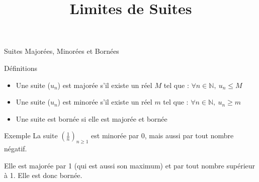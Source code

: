 \documentclass{cours}
\title{Limites de Suites}
\begin{document}

    \begin{Gpartie}{Suites Majorées, Minorées et Bornées} 
        \begin{Spartie}{Définitions} 
            \begin{itemize}
                \item Une suite ($u_n$) est majorée s'il existe un réel $M$ tel que : $\forall n\in\mathbb{N},\ u_n\leq M$
                \item Une suite ($u_n$) est minorée s'il existe un réel $m$ tel que : $\forall n\in\mathbb{N},\ u_n\geq m$
                \item Une suite est bornée si elle est majorée et bornée
            \end{itemize}
        \end{Spartie}
        \begin{Spartie}{Exemple} 
            La suite $\left(\frac{1}{n}\right)_{n\geq 1}$ est minorée par 0, mais aussi par tout nombre négatif. 
            
            Elle est majorée par 1 (qui est aussi son maximum) et par tout nombre supérieur à 1. Elle est donc bornée.
        \end{Spartie}
    \end{Gpartie}
\end{document}
